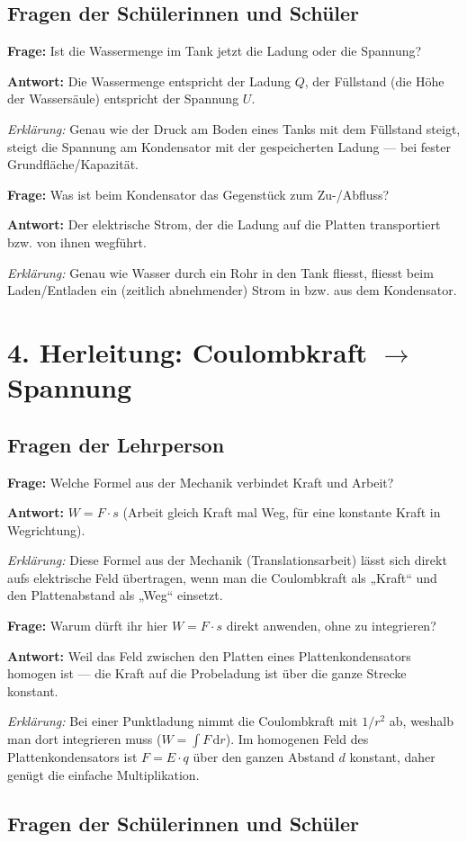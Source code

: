 \documentclass[11pt,a4paper]{article}
\newcommand{\Frage}[1]{\textbf{Frage:} #1\par}
\newcommand{\Antwort}[1]{\textbf{Antwort:} #1\par}
\newcommand{\Erklaerung}[1]{\textit{Erklärung:} #1}
\newcommand{\FrageBlock}[3]{\Frage{#1}\Antwort{#2}\Erklaerung{#3}\vspace{0.6em}}
\begin{document}
\subsection*{Fragen der Schülerinnen und Schüler}

\FrageBlock{Ist die Wassermenge im Tank jetzt die Ladung oder die Spannung?}
{Die Wassermenge entspricht der Ladung $Q$, der Füllstand (die Höhe der Wassersäule) entspricht der Spannung $U$.}
{Genau wie der Druck am Boden eines Tanks mit dem Füllstand steigt, steigt die Spannung am Kondensator mit der gespeicherten Ladung --- bei fester Grundfläche/Kapazität.}

\FrageBlock{Was ist beim Kondensator das Gegenstück zum Zu-/Abfluss?}
{Der elektrische Strom, der die Ladung auf die Platten transportiert bzw. von ihnen wegführt.}
{Genau wie Wasser durch ein Rohr in den Tank fliesst, fliesst beim Laden/Entladen ein (zeitlich abnehmender) Strom in bzw. aus dem Kondensator.}

\section*{4. Herleitung: Coulombkraft $\to$ Spannung}

\subsection*{Fragen der Lehrperson}

\FrageBlock{Welche Formel aus der Mechanik verbindet Kraft und Arbeit?}
{$W=F\cdot s$ (Arbeit gleich Kraft mal Weg, für eine konstante Kraft in Wegrichtung).}
{Diese Formel aus der Mechanik (Translationsarbeit) lässt sich direkt aufs elektrische Feld übertragen, wenn man die Coulombkraft als „Kraft“ und den Plattenabstand als „Weg“ einsetzt.}

\FrageBlock{Warum dürft ihr hier $W=F\cdot s$ direkt anwenden, ohne zu integrieren?}
{Weil das Feld zwischen den Platten eines Plattenkondensators homogen ist --- die Kraft auf die Probeladung ist über die ganze Strecke konstant.}
{Bei einer Punktladung nimmt die Coulombkraft mit $1/r^2$ ab, weshalb man dort integrieren muss ($W=\int F\,\mathrm{d}r$). Im homogenen Feld des Plattenkondensators ist $F=E\cdot q$ über den ganzen Abstand $d$ konstant, daher genügt die einfache Multiplikation.}

\subsection*{Fragen der Schülerinnen und Schüler}
\end{document}
